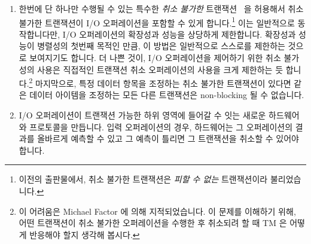 \begin{enumerate}
\fi

\item	한번에 단 하나만 수행될 수 있는 특수한 \emph{취소 불가한}
	트랜잭션~\cite{SpearMichaelScott2008InevitableSTM} 을 허용해서 취소
	불가한 트랜잭션이 I/O 오퍼레이션을 포함할 수 있게 합니다.\footnote{
		이전의 출판물에서, 취소 불가한 트랜잭션은 \emph{피할 수 없는}
		트랜잭션이라 불리었습니다.}
	이는 일반적으로 동작합니다만, I/O 오퍼레이션의 확장성과 성능을 상당하게
	제한합니다.
	확장성과 성능이 병렬성의 첫번째 목적인 만큼, 이 방법은 일반적으로
	스스로를 제한하는 것으로 보여지기도 합니다.
	더 나쁜 것이, I/O 오퍼레이션을 제어하기 위한 취소 불가성의 사용은
	직접적인 트랜잭션 취소 오퍼레이션의 사용을 크게 제한하는 듯
	합니다.\footnote{
		이 어려움은 Michael Factor 에 의해 지적되었습니다.
		이 문제를 이해하기 위해, 어떤 트랜잭션이 취소 불가한
		오퍼레이션을 수행한 후 취소되려 할 때 TM 은 어떻게 반응해야
		할지 생각해 봅시다.}
	마지막으로, 특정 데이터 항목을 조정하는 취소 불가한 트랜잭션이 있다면
	같은 데이터 아이템을 조정하는 모든 다른 트랜잭션은 non-blocking 될 수
	없습니다.

\item	I/O 오퍼레이션이 트랜잭션 가능한 하위 영역에 들어갈 수 잇는 새로운
	하드웨어와 프로토콜을 만듭니다.
	입력 오퍼레이션의 경우, 하드웨어는 그 오퍼레이션의 결과를 올바르게
	예측할 수 있고 그 예측이 틀리면 그 트랜잭션을 취소할 수 있어야 합니다.

\end{enumerate}

